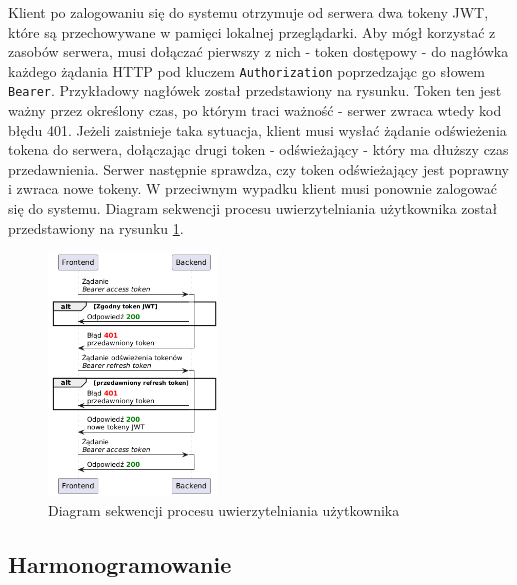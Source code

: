 Klient po zalogowaniu się do systemu otrzymuje od serwera dwa tokeny JWT, które są przechowywane w pamięci lokalnej przeglądarki. Aby mógł korzystać z zasobów serwera, musi dołączać pierwszy z nich - token dostępowy - do nagłówka każdego żądania HTTP pod kluczem \texttt{Authorization} poprzedzając go słowem \texttt{Bearer}. Przykładowy nagłówek został przedstawiony na rysunku. Token ten jest ważny przez określony czas, po którym traci ważność - serwer zwraca wtedy kod błędu 401. Jeżeli zaistnieje taka sytuacja, klient musi wysłać żądanie odświeżenia tokena do serwera, dołączając drugi token - odświeżający - który ma dłuższy czas przedawnienia. Serwer następnie sprawdza, czy token odświeżający jest poprawny i zwraca nowe tokeny. W przeciwnym wypadku klient musi ponownie zalogować się do systemu. Diagram sekwencji procesu uwierzytelniania użytkownika został przedstawiony na rysunku \ref{fig:authSequence}.

\begin{figure} [H]
    \centering
    \includegraphics[width=0.4\textwidth]{graf/jwtSeq.png}
    \caption{Diagram sekwencji procesu uwierzytelniania użytkownika}
    \label{fig:authSequence}
\end{figure}

\subsection{Harmonogramowanie}

